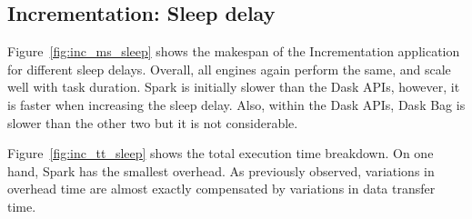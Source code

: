 \documentclass[conference]{IEEEtran}
\begin{document}
\subsection{Incrementation: Sleep delay}
Figure~\ref{fig:inc_ms_sleep} shows the makespan of the Incrementation application
for different sleep delays. Overall, all engines again perform the same, and scale
well with task duration. Spark is initially slower than the Dask APIs, however, it is
faster when increasing the sleep delay. Also, within the Dask APIs, Dask Bag is
slower than the other two but it is not considerable.

Figure~\ref{fig:inc_tt_sleep} shows the total execution time breakdown. On
one hand, Spark has the smallest overhead. As previously observed,
variations in overhead time are almost exactly compensated by variations in data
transfer time.

\end{document}
